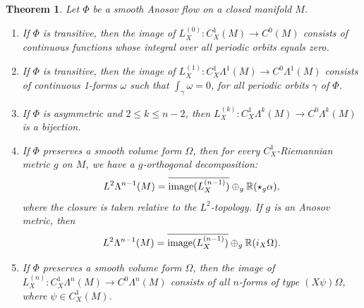 \documentclass[11pt,letterpaper,reqno,abstract=true]{scrartcl}
\theoremstyle{plain}                              %
\newtheorem{thm}{Theorem}[section]
\theoremstyle{definition}                         %
\theoremstyle{remark}                             %
\begin{document}
\begin{thm}     \label{thm:decomposition}
  Let $\Phi$ be a smooth Anosov flow on a closed manifold $M$. 

  \begin{enumerate}
  \item[(a)] If $\Phi$ is transitive, then the image of
    $L_X^{(0)} : C^1_X(M) \to C^0(M)$ consists of continuous functions whose
    integral over all periodic orbits equals zero.

  \item[(b)] If $\Phi$ is transitive, then the image of
    $L_X^{(1)} : C^1_X \Lambda^1(M) \to C^0 \Lambda^1(M)$ consists of continuous
    1-forms $\omega$ such that $\int_\gamma \omega = 0$, for all
    periodic orbits $\gamma$ of $\Phi$.

  \item[(c)] If $\Phi$ is asymmetric and $2 \leq k \leq n-2$, then
    $L_X^{(k)} : C^1_X \Lambda^k(M) \to C^0 \Lambda^k(M)$ is a bijection.

  \item[(d)] If $\Phi$ preserves a smooth volume form $\Omega$, then
    for every $C^1_X$-Riemannian metric $g$ on $M$, we have a
    $g$-orthogonal decomposition:
  \begin{displaymath}
    L^2 \Lambda^{n-1}(M) = \overline{\text{\normalfont image}(L_X^{(n-1)})} \oplus_g
    \mathbb{R} (\star_g \alpha), 
  \end{displaymath}
  where the closure is taken relative to the $L^2$-topology. If $g$ is
  an Anosov metric, then
  \begin{displaymath}
     L^2 \Lambda^{n-1}(M) = \overline{\text{\normalfont image}(L_X^{(n-1)})} \oplus_g
    \mathbb{R} (i_X \Omega).
  \end{displaymath}
  \item[(e)] If $\Phi$ preserves a smooth volume form $\Omega$, then
  the image of $L_X^{(n)} : C^1_X \Lambda^n(M) \to C^0 \Lambda^n(M)$
  consists of all $n$-forms of type $(X\psi) \Omega$, where
  $\psi \in C^1_X(M)$.
    
  \end{enumerate}

\end{thm}
\end{document}
